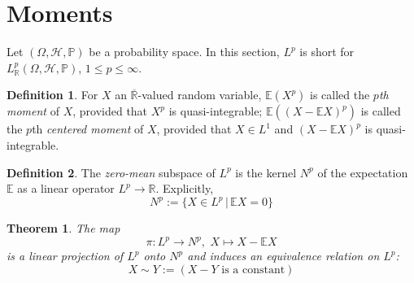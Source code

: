 \documentclass[11pt, a4paper, openany]{book}
\newtheorem{thm}{Theorem}\newtheorem{lem}{Lemma}\newtheorem{crl}{Corollary}
\theoremstyle{definition}
\newtheorem{define}{Definition}\newtheorem{exam}{Example}\newtheorem{remark}{Remark}
\newcommand{\er}{\overline{\mathbb{R}}}
\begin{document}
\section{Moments}
    Let $(\Omega,\mathscr{H},\mathbb{P})$ be a probability space. In this section, $L^p$ is short for $L^p_\mathbb{R}(\Omega,\mathscr{H},\mathbb{P})$, $1\leqslant p\leqslant \infty$.
    \begin{define}
        For $X$ an $\er$-valued random variable, $\mathbb{E}(X^p)$ is called the \textit{$p$th moment} of $X$, provided that $X^p$ is quasi-integrable;
        $\mathbb{E}((X-\mathbb{E}X)^p)$ is called the $p$th \textit{centered moment} of $X$, provided that $X\in L^1$ and $(X-\mathbb{E}X)^p$ is quasi-integrable.
    \end{define}
    \begin{define}
        The \textit{zero-mean} subspace of $L^p$ is the kernel $N^p$ of the expectation $\mathbb{E}$ as a linear operator $L^p\rightarrow \mathbb{R}$. Explicitly,
        \[
            N^p:=\{X\in L^p\,|\,\mathbb{E}X=0\}
        \]
    \end{define}
    \begin{thm}
        The map
        \[
            \pi:L^p\rightarrow N^p,\,\,X\mapsto X-\mathbb{E}X
        \]
        is a linear projection of $L^p$ onto $N^p$ and induces an equivalence relation on $L^p$:
        \[
            X\sim Y:=(X-Y\text{ is a constant})
        \]
    \end{thm}
\end{document}
